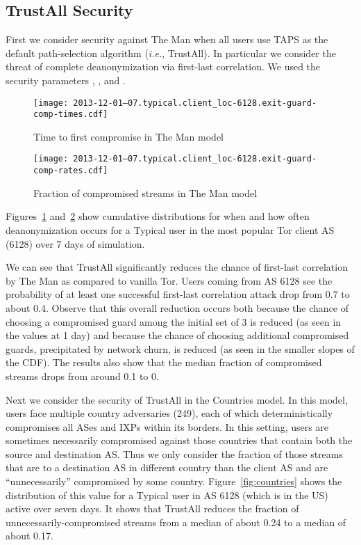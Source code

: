\documentclass[conference]{styles/IEEEtran}
\newcommand{\ie}{\emph{i.e.}}
\newcommand{\ps}{TAPS\xspace}
\begin{document}
\subsection{TrustAll Security} \label{subsec:sec:trustall}
First we consider security against \textsf{The Man} when all users use \ps as the default
path-selection
algorithm (\ie{}, TrustAll). In particular we consider the threat of complete deanonymization via 
first-last correlation. We used the security parameters
,
, and
.
\begin{figure}[t]
\texttt{[image: 2013-12-01--07.typical.client\_loc-6128.exit-guard-comp-times.cdf]}
\vspace{-4mm}
\caption{\small Time to first compromise in \textsf{The Man} model}
\vspace{-4mm}
\label{fig:the-man-time.cdf}
\end{figure}
\begin{figure}[t]
\texttt{[image: 2013-12-01--07.typical.client\_loc-6128.exit-guard-comp-rates.cdf]}
\vspace{-4mm}
\caption{\small Fraction of compromised streams in \textsf{The Man} model}
\vspace{-4mm}
\label{fig:the-man-rate.cdf}
\end{figure}
Figures~\ref{fig:the-man-time.cdf} and~\ref{fig:the-man-rate.cdf} show cumulative distributions for
when and how often deanonymization occurs for a Typical user in the most popular Tor client AS
(6128) over 7 days of simulation.

We can see that TrustAll significantly reduces the chance of first-last correlation by
\textsf{The Man} as compared to vanilla Tor. Users coming from AS 6128 see the probability of at
least one successful first-last correlation attack drop from 0.7 to about 0.4. Observe that this
overall reduction occurs both because the chance of choosing a compromised guard among the initial
set of 3 is reduced (as seen in the values at 1 day) and because the chance of choosing additional 
compromised guards, precipitated by network churn, is reduced (as seen in the smaller slopes
of the CDF). The results also show that the median fraction of compromised streams drops from
around 0.1 to 0.

Next we consider the security of TrustAll in the \textsf{Countries} model. In this model, users
face multiple country adversaries (249), each of which deterministically compromises all ASes and
IXPs within its borders. In this setting, users are sometimes necessarily compromised against those
countries that contain both the source and destination AS. Thus we only consider the fraction of
those streams that are to a destination AS in different country than the client AS and are
``unnecessarily'' compromised by some country. Figure~\ref{fig:countries}
shows the distribution of this value for a Typical user in AS 6128 (which is in the US)
active over seven days. It shows that TrustAll reduces the fraction
of unnecessarily-compromised streams from a median of about 0.24 to a median of about 0.17.
\end{document}
